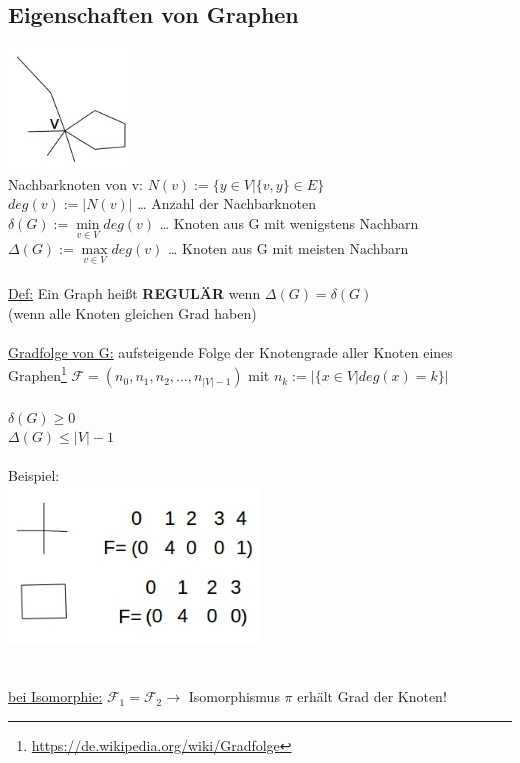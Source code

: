 \subsection{Eigenschaften von Graphen}
\includegraphics[width=0.25\textwidth]{lectures/161014/pix/8.jpg}\\
Nachbarknoten von v: $N(v):=\{y \in V|\{v,y\} \in E\}$\\
$deg(v):=|N(v)|$ … Anzahl der Nachbarknoten\\
$\delta(G):= \min \limits_{v \in V} deg(v)$ … Knoten aus G mit wenigstens Nachbarn\\
$\Delta(G):= \max \limits_{v \in V} deg(v)$ … Knoten aus G mit meisten Nachbarn\\
\\
\underline{Def:} Ein Graph heißt \textbf{REGULÄR} wenn $\Delta(G)=\delta(G)$\\(wenn alle Knoten gleichen Grad haben)
\\\\
\underline{Gradfolge von G:} aufsteigende Folge der Knotengrade aller Knoten eines Graphen\footnote{\url{https://de.wikipedia.org/wiki/Gradfolge}} $\mathcal{F}=(n_0,n_1,n_2,…,n_{|V|-1})$ mit $n_k:=|\{x \in V|deg(x)=k\}|$\\\\
$\delta(G) \geq 0$\\
$\Delta(G) \leq |V|-1$\\\\
Beispiel:\\
\includegraphics[width=0.5\textwidth]{lectures/161014/pix/9.jpg}\\
\\\\
\underline{bei Isomorphie:} $\mathcal{F}_1=\mathcal{F}_2 \rightarrow$ Isomorphismus $\pi$ erhält Grad der Knoten!

